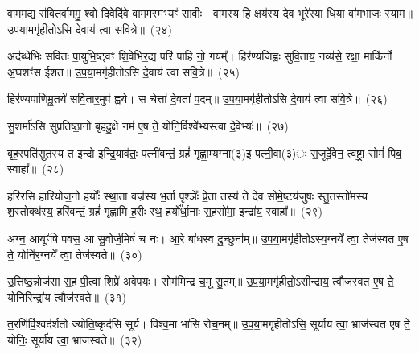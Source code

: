 {\anuvakamend[{वः॒ स॒प्तविꣳ॑शतिश्च}]}%

वा॒मम॒द्य स॑वितर्वा॒ममु॒ श्वो दि॒वेदि॑वे वा॒मम॒स्मभ्यꣳ॑ सावीः। वा॒मस्य॒ हि क्षय॑स्य देव॒ भूरे॑र॒या धि॒या वा॑म॒भाजः॑ स्याम॥ उ॒प॒या॒मगृ॑हीतो\-ऽसि दे॒वाय॑ त्वा सवि॒त्रे॥~(२४)

{\anuvakamend[{वा॒मं चतु॑र्विꣳशतिः}]}%

अद॑ब्धेभिः सवितः पा॒युभि॒ष्ट्वꣳ शि॒वेभि॑र॒द्य परि॑ पाहि नो॒ गयम्᳚। हिर॑ण्यजिह्वः सुवि॒ताय॒ नव्य॑से॒ रक्षा॒ माकि॑र्नो अ॒घशꣳ॑स ईशत॥ उ॒प॒या॒मगृ॑हीतो\-ऽसि दे॒वाय॑ त्वा सवि॒त्रे॥~(२५)

{\anuvakamend[{अद॑ब्धेभि॒स्त्रयो॑विꣳशतिः}]}%

हिर॑ण्यपाणिमू॒तये॑ सवि॒तार॒मुप॑ ह्वये। स चेत्ता॑ दे॒वता॑ प॒दम्॥ उ॒प॒या॒मगृ॑हीतो\-ऽसि दे॒वाय॑ त्वा सवि॒त्रे॥~(२६)

{\anuvakamend[{हिर॑ण्यपाणिं॒ चतु॑र्दश}]}%

सु॒शर्मा॑\-ऽसि सुप्रतिष्ठा॒नो बृ॒हदु॒क्षे नम॑ ए॒ष ते॒ योनि॒र्विश्वे᳚भ्यस्त्वा दे॒वेभ्यः॑॥~(२७)

{\anuvakamend[{सु॒शर्मा॒ द्वाद॑श}]}%

बृह॒स्पति॑सुतस्य त इन्दो इन्द्रि॒याव॑तः॒ पत्नी॑वन्तं॒ ग्रहं॑ गृह्णा॒म्यग्ना(३)इ पत्नी॒वा(३)ः स॒जूर्दे॒वेन॒ त्वष्ट्रा॒ सोमं॑ पिब॒ स्वाहा᳚॥~(२८)

{\anuvakamend[{बृह॒स्पति॑सुतस्य॒ पञ्च॑दश}]}%

हरि॑रसि हारियोज॒नो हर्योः᳚ स्था॒ता वज्र॑स्य भ॒र्ता पृश्ञेः᳚ प्रे॒ता तस्य॑ ते देव सोमे॒ष्टय॑जुषः स्तु॒तस्तो॑मस्य श॒स्तोक्थ॑स्य॒ हरि॑वन्तं॒ ग्रहं॑ गृह्णामि ह॒रीः स्थ॒ हर्यो᳚र्धा॒नाः स॒हसो॑मा॒ इन्द्रा॑य॒ स्वाहा᳚॥~(२९)

{\anuvakamend[{हरिः॒ षड्विꣳ॑शतिः}]}%

अग्न॒ आयूꣳ॑षि पवस॒ आ सु॒वोर्ज॒मिषं॑ च नः। आ॒रे बा॑धस्व दु॒च्छुना᳚म्॥ उ॒प॒या॒मगृ॑हीतो\-ऽस्य॒ग्नये᳚ त्वा॒ तेज॑स्वत ए॒ष ते॒ योनि॑र॒ग्नये᳚ त्वा॒ तेज॑स्वते॥~(३०)

{\anuvakamend[{अग्न॒ आयूꣳ॑षि॒ त्रयो॑वि ꣳशतिः}]}%

उ॒त्तिष्ठ॒न्नोज॑सा स॒ह पी॒त्वा शिप्रे॑ अवेपयः। सोम॑मिन्द्र च॒मू सु॒तम्॥ उ॒प॒या॒मगृ॑हीतो॒\-ऽसीन्द्रा॑य॒ त्वौज॑स्वत ए॒ष ते॒ योनि॒रिन्द्रा॑य॒ त्वौज॑स्वते॥~(३१)

{\anuvakamend[{उ॒त्तिष्ठ॒न्नेक॑विꣳशतिः}]}%

त॒रणि॑र्वि॒श्वद॑र्\mbox{}शतो ज्योति॒ष्कृद॑सि सूर्य। विश्व॒मा भा॑सि रोच॒नम्॥ उ॒प॒या॒मगृ॑हीतो\-ऽसि॒ सूर्या॑य त्वा॒ भ्राज॑स्वत ए॒ष ते॒ योनिः॒ सूर्या॑य त्वा॒ भ्राज॑स्वते॥~(३२)

